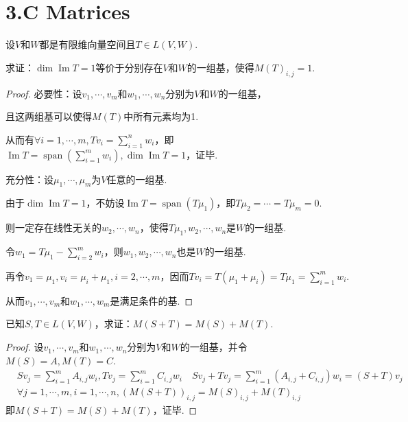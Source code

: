 \section{3.C Matrices}

\begin{problem}[6]\label{3.C.6}
    设\(V\)和\(W\)都是有限维向量空间且\(T \in L(V,W)\).

    求证：\(\dim \operatorname{Im} T=1\)等价于分别存在\(V\)和\(W\)的一组基，使得\(M(T)_{i,j}=1\).    
\end{problem}

\begin{proof}
    必要性：设\(v_1,\cdots,v_m\)和\(w_1,\cdots,w_n\)分别为\(V\)和\(W\)的一组基，

    且这两组基可以使得\(M(T)\)中所有元素均为1.
    
    从而有\(\forall i=1,\cdots,m,Tv_i=\sum_{i=1}^n w_i\)，即\(\operatorname{Im} T=\operatorname{span} (\sum_{i=1}^m w_i),\dim \operatorname{Im} T=1\)，证毕.
    
    充分性：设\(\mu_1,\cdots,\mu_m\)为\(V\)任意的一组基.
    
    由于\(\dim \operatorname{Im} T=1\)，不妨设\(\operatorname{Im} T=\operatorname{span} (T \mu_1)\)，即\(T \mu_2=\cdots=T \mu_m=0\).
    
    则一定存在线性无关的\(w_2,\cdots,w_n\)，使得\(T \mu_1,w_2,\cdots,w_n\)是\(W\)的一组基.
    
    令\(w_1=T \mu_1-\sum_{i=2}^m w_i\)，则\(w_1,w_2,\cdots,w_n\)也是\(W\)的一组基.
    
    再令\(v_1=\mu_1,v_i=\mu_i+\mu_1,i=2,\cdots,m\)，因而\(Tv_i=T(\mu_1+\mu_i)=T \mu_1=\sum_{i=1}^m w_i\).
    
    从而\(v_1,\cdots,v_m\)和\(w_1,\cdots,w_m\)是满足条件的基.    
\end{proof}

\begin{problem}[7]\label{3.B.7}
    已知\(S,T \in L(V,W)\)，求证：\(M(S+T)=M(S)+M(T)\).
\end{problem}

\begin{proof}
    设\(v_1,\cdots,v_m\)和\(w_1,\cdots,w_n\)分别为\(V\)和\(W\)的一组基，并令\(M(S)=A,M(T)=C\).
    \begin{align*}
        &Sv_j=\sum_{i=1}^m A_{i,j}w_i,Tv_j=\sum_{i=1}^m C_{i,j}w_i \quad
        Sv_j+Tv_j=\sum_{i=1}^m (A_{i,j}+C_{i,j})w_i=(S+T)v_j \\
        &\forall j=1,\cdots,m,i=1,\cdots,n,(M(S+T))_{i,j}=M(S)_{i,j}+M(T)_{i,j}
    \end{align*}
    即\(M(S+T)=M(S)+M(T)\)，证毕.
\end{proof}

